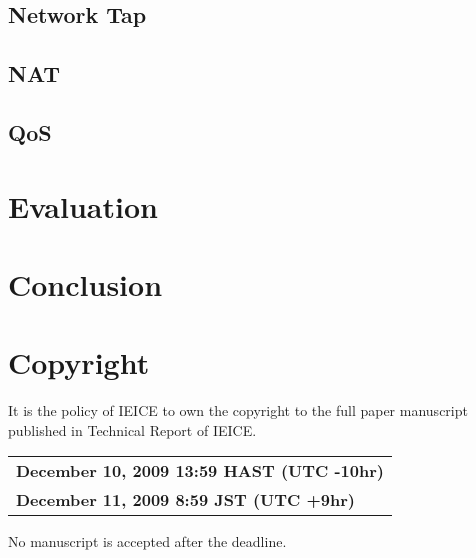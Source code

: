 \subsection{Network Tap}
\subsection{NAT}
\subsection{QoS}



\section{Evaluation}




\section{Conclusion}



\section{Copyright}

It is the policy of IEICE to own the copyright to the
full paper manuscript published in Technical Report of
IEICE.


\begin{center}
\begin{tabular}{l}
 \bf December 10, 2009 13:59 HAST (UTC -10hr) \\
 \bf December 11, 2009 8:59 JST (UTC +9hr)
\end{tabular}
\end{center}

No manuscript is accepted after the deadline.
